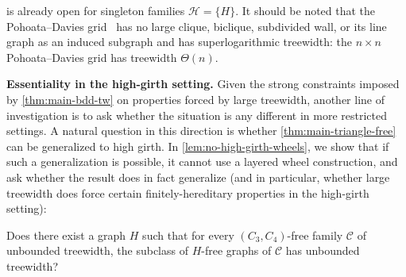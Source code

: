  is already open for singleton families $\mathcal H = \{H\}$.
It should be noted that the Pohoata--Davies grid~\cite{Pohoata14,Davies22} has no large clique, biclique, subdivided wall, or its line graph as an induced subgraph and has superlogarithmic treewidth: the $n \times n$ Pohoata--Davies grid has treewidth $\Theta(n)$.  

\medskip





\textbf{Essentiality in the high-girth setting.} Given the strong constraints imposed by \cref{thm:main-bdd-tw} on properties forced by large treewidth, another line of investigation is to ask whether the situation is any different in more restricted settings. A natural question in this direction is whether \cref{thm:main-triangle-free} can be generalized to high girth. In \cref{lem:no-high-girth-wheels}, we show that if such a generalization is possible, it cannot use a layered wheel construction, and ask whether the result does in fact generalize (and in particular, whether large treewidth does force certain finitely-hereditary properties in the high-girth setting):

\begin{problem} \label{conj:no-high-girth}
    Does there exist a graph $H$ such that for every $(C_3, C_4)$-free family $\mathcal C$ of unbounded treewidth, the subclass of $H$-free graphs of $\mathcal C$ has unbounded treewidth? 
\end{problem}